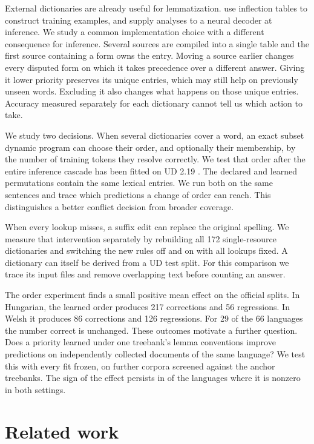\documentclass[11pt]{article}
\begin{document}
External dictionaries are already useful for lemmatization.
\citet{bergmanis-goldwater-2019-data} use inflection tables to construct
training examples, and \citet{milintsevich-sirts-2021-enhancing} supply
analyses to a neural decoder at inference. We study a common implementation
choice with a different consequence for inference. Several sources are
compiled into a single table and the first source containing a form owns the
entry. Moving a source earlier changes every disputed form on which it takes
precedence over a different answer. Giving it lower priority preserves its
unique entries, which may still help on previously unseen words. Excluding it
also changes what happens on those unique entries. Accuracy measured
separately for each dictionary cannot tell us which action to take.

We study two decisions. When several dictionaries cover a word, an exact
subset dynamic program can choose their order, and optionally their membership,
by the number of training tokens they resolve correctly. We test that order after
the entire inference cascade has been fitted on UD 2.19 \citep{ud219}.
The declared and learned permutations contain the same lexical entries.
We run both on the same sentences and trace which predictions a change of order
can reach. This distinguishes a better conflict decision from broader coverage.

When every lookup misses, a suffix edit can replace the original spelling.
We measure that intervention separately by rebuilding all 172 single-resource
dictionaries and switching the new rules off and on with all lookups fixed.
A dictionary can itself be derived from a UD test split. For this comparison
we trace its input files and remove overlapping text before counting an answer.

The order experiment finds a small positive mean effect on the official splits.
In Hungarian, the learned order produces 217 corrections and 56 regressions.
In Welsh it produces 86 corrections and 126 regressions. For 29 of the 66
languages the number correct is unchanged. These outcomes motivate a further
question. Does a priority learned under one treebank's lemma conventions
improve predictions on independently collected documents of the same language?
We test this with every fit frozen, on \trGoldCorpora{} further corpora
screened against the anchor treebanks. The sign of the effect persists in
\trSameSign{} of the \trBothSign{} languages where it is nonzero in both settings.

\section{Related work}
\end{document}
